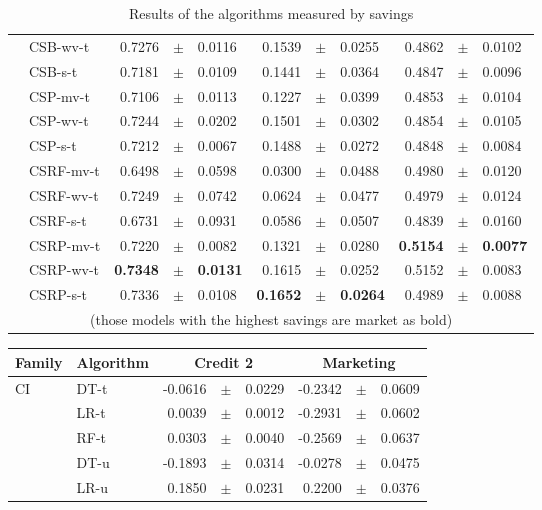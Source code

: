 {\begin{table}[!t]
\begin{tabular}{l l r@{\hskip 0in}c@{\hskip 0in}l r@{\hskip 0in}c@{\hskip 0in}l r@{\hskip 
    0in}c@{\hskip 0in}l  }
&CSB-wv-t & 0.7276 &$\pm$& 0.0116 & 0.1539 &$\pm$& 0.0255 & 0.4862 &$\pm$& 0.0102 \\
&CSB-s-t & 0.7181 &$\pm$& 0.0109 & 0.1441 &$\pm$& 0.0364 & 0.4847 &$\pm$& 0.0096 \\
&CSP-mv-t & 0.7106 &$\pm$& 0.0113 & 0.1227 &$\pm$& 0.0399 & 0.4853 &$\pm$& 0.0104 \\
&CSP-wv-t & 0.7244 &$\pm$& 0.0202 & 0.1501 &$\pm$& 0.0302 & 0.4854 &$\pm$& 0.0105 \\
&CSP-s-t & 0.7212 &$\pm$& 0.0067 & 0.1488 &$\pm$& 0.0272 & 0.4848 &$\pm$& 0.0084 \\
&CSRF-mv-t & 0.6498 &$\pm$& 0.0598 & 0.0300 &$\pm$& 0.0488 & 0.4980 &$\pm$& 0.0120 \\
&CSRF-wv-t & 0.7249 &$\pm$& 0.0742 & 0.0624 &$\pm$& 0.0477 & 0.4979 &$\pm$& 0.0124 \\
&CSRF-s-t & 0.6731 &$\pm$& 0.0931 & 0.0586 &$\pm$& 0.0507 & 0.4839 &$\pm$& 0.0160 \\
&CSRP-mv-t & 0.7220 &$\pm$& 0.0082 & 0.1321 &$\pm$& 0.0280 & \bf{0.5154} &\bf{$\pm$}& \bf{0.0077} \\
&CSRP-wv-t & \bf{0.7348} &\bf{$\pm$}& \bf{0.0131} & 0.1615 &$\pm$& 0.0252 & 0.5152 &$\pm$& 0.0083 \\
&CSRP-s-t & 0.7336 &$\pm$& 0.0108 & \bf{0.1652} &\bf{$\pm$}& \bf{0.0264} & 0.4989 &$\pm$& 0.0088 \\
  \hline
  \multicolumn{11}{c}{(those models with the highest savings are market as bold)}
  \end{tabular}
    \caption{Results of the algorithms measured by savings}
    \label{tab:9:results_savings}
  \end{table}
\begin{table}[!t]
    \centering
    \footnotesize
    \begin{tabular}{l l r@{\hskip 0in}c@{\hskip 0in}l r@{\hskip 0in}c@{\hskip 0in}l  } %
    \hline
    \bf{Family} & \bf{Algorithm} &  \multicolumn{3}{c}{\bf{Credit 2}} 
& \multicolumn{3}{c}{\bf{Marketing}} \\ 
    \hline
CI&DT-t & -0.0616 &$\pm$& 0.0229 & -0.2342 &$\pm$& 0.0609\\ 
&LR-t & 0.0039 &$\pm$& 0.0012 & -0.2931 &$\pm$& 0.0602\\ 
&RF-t & 0.0303 &$\pm$& 0.0040 & -0.2569 &$\pm$& 0.0637\\ 
&DT-u & -0.1893 &$\pm$& 0.0314 & -0.0278 &$\pm$& 0.0475\\ 
&LR-u &  0.1850 &$\pm$& 0.0231 & 0.2200 &$\pm$& 0.0376\\ 

\end{tabular}
\end{table}}
